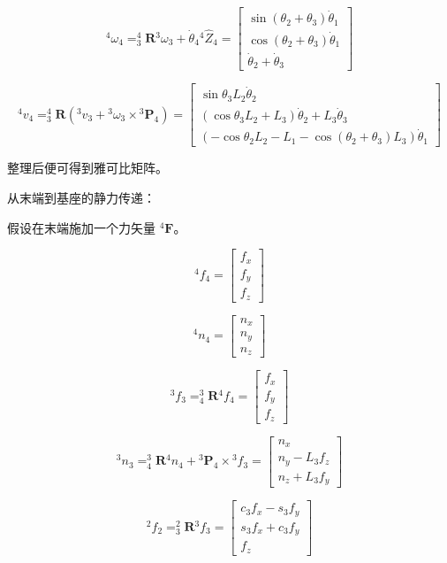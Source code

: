 \documentclass{homework}
\begin{document}
\begin{sol}
\[
  {^4}\omega_4 = _3^4\mathbf{R} {^3}\omega_3 + \dot{\theta}_4 {^4}\hat{Z}_4 =
  \begin{bmatrix}
    \sin(\theta_2 + \theta_3) \dot{\theta}_1 \\
    \cos(\theta_2 + \theta_3) \dot{\theta}_1 \\
    \dot{\theta}_2 + \dot{\theta}_3
  \end{bmatrix}
\]

\[
  {^4}v_4 = _3^4\mathbf{R} ({^3}v_3 + {^3}\omega_3 \times {^3}\mathbf{P}_4) =
  \begin{bmatrix}
    \sin\theta_3 L_2 \dot{\theta}_2 \\
    (\cos\theta_3 L_2 + L_3) \dot{\theta}_2 + L_3 \dot{\theta}_3 \\
    (-\cos\theta_2 L_2 - L_1 - \cos(\theta_2 + \theta_3) L_3) \dot{\theta}_1
  \end{bmatrix}
\]

整理后便可得到雅可比矩阵。

从末端到基座的静力传递：

假设在末端施加一个力矢量 $ {^4}\mathbf{F} $。

\[
  {^4}f_4 = 
  \begin{bmatrix}
    f_x \\
    f_y \\
    f_z
  \end{bmatrix}
\]

\[
  {^4}n_4 = 
  \begin{bmatrix}
    n_x \\
    n_y \\
    n_z
  \end{bmatrix}
\]

\[
  {^3}f_3 = _4^3\mathbf{R} {^4}f_4 =
  \begin{bmatrix}
    f_x \\
    f_y \\
    f_z
  \end{bmatrix}
\]

\[
  {^3}n_3 = _4^3\mathbf{R} {^4}n_4 + {^3}\mathbf{P}_4 \times {^3}f_3 =
  \begin{bmatrix}
    n_x \\
    n_y - L_3 f_z \\
    n_z + L_3 f_y
  \end{bmatrix}
\]

\[
  {^2}f_2 = _3^2\mathbf{R} {^3}f_3 =
  \begin{bmatrix}
    c_3 f_x - s_3 f_y \\
    s_3 f_x + c_3 f_y \\
    f_z
  \end{bmatrix}
\]


\end{sol}
\end{document}
